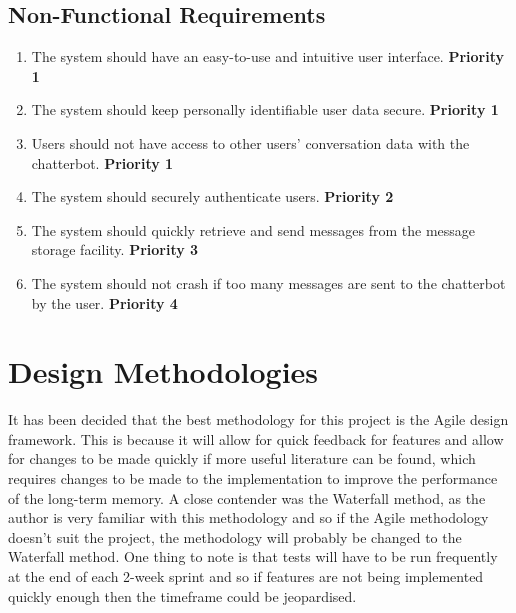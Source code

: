 \subsection{Non-Functional Requirements} \label{ssection:non-functional}
\begin{enumerate}
	\item The system should have an easy-to-use and intuitive user interface. \textbf{Priority 1}
	\item The system should keep personally identifiable user data secure. \textbf{Priority 1}
	\item Users should not have access to other users' conversation data with the chatterbot. \textbf{Priority 1}
	\item The system should securely authenticate users. \textbf{Priority 2}
	\item The system should quickly retrieve and send messages from the message storage facility. \textbf{Priority 3}
	\item The system should not crash if too many messages are sent to the chatterbot by the user. \textbf{Priority 4}
\end{enumerate}
\section{Design Methodologies}
It has been decided that the best methodology for this project is the Agile design framework. This is because it will allow for quick feedback for features and allow for changes to be made quickly if more useful literature can be found, which requires changes to be made to the implementation to improve the performance of the long-term memory. A close contender was the Waterfall method, as the author is very familiar with this methodology and so if the Agile methodology doesn't suit the project, the methodology will probably be changed to the Waterfall method. One thing to note is that tests will have to be run frequently at the end of each 2-week sprint and so if features are not being implemented quickly enough then the timeframe could be jeopardised.
